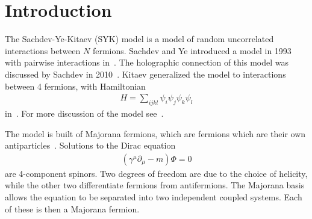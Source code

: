\documentclass[12pt]{article} %
\begin{document}
\section{Introduction}

The Sachdev-Ye-Kitaev (SYK) model is a model of random uncorrelated interactions between $N$ fermions. Sachdev and Ye introduced a model in 1993 with pairwise interactions in~\cite{sachdev93}. The holographic connection of this model was discussed by Sachdev in 2010~\cite{sachdev10}. Kitaev generalized the model to interactions between 4 fermions, with Hamiltonian
\begin{align}
H = \sum_{ijkl}\psi_i\psi_j\psi_k\psi_l
\end{align}
in~\cite{kitaev15}. For more discussion of the model see~\cite{mald16}.

The model is built of Majorana fermions, which are fermions which are their own antiparticles~\cite{elliott14}. Solutions to the Dirac equation
\begin{align}
(\gamma^\mu\partial_\mu - m)\Phi = 0
\end{align}
are 4-component spinors. Two degrees of freedom are due to the choice of helicity, while the other two differentiate fermions from antifermions. The Majorana basis allows the equation to be separated into two independent coupled systems. Each of these is then a Majorana fermion. 
\end{document}
